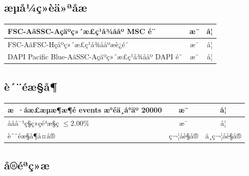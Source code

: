 \documentclass[UTF8,10pt,a4paper,fontset=fandol]{ctexart}
\newcommand{\fieldvalue}[1]{#1}
\newcommand{\handwritten}[1]{#1}
\begin{document}
\subsection*{æµå¼ç»èä»ªåæ}

\begin{tabularx}{\textwidth}{|X|c|c|}
\hline
FSC-AãSSC-Açäºç»´æ£ç¹å¾ååº MSC é¨ &
\fieldvalue{\handwritten{æ¯}} & å¦ \\
\hline
FSC-AãFSC-Hçäºç»´æ£ç¹å¾ååºæè¿é¨ &
\fieldvalue{\handwritten{æ¯}} & å¦ \\
\hline
DAPI Pacific Blue-AãSSC-Açäºç»´æ£ç¹å¾ååº DAPI é¨ &
\fieldvalue{\handwritten{æ¯}} & å¦ \\
\hline
\end{tabularx}

\subsection*{è´¨éæ§å¶}

\begin{tabularx}{\textwidth}{|X|c|c|}
\hline
æ ·åæ£æµæ¶æ¶é events æ°éä¸å°äº 20000 &
\fieldvalue{\handwritten{æ¯}} & å¦ \\
\hline
ååå¯¹ç§ç»çé³æ§ç $\leq 2.00\%$ &
\fieldvalue{\handwritten{æ¯}} & å¦ \\
\hline
è´¨éæ§å¶å¤å® &
\fieldvalue{\handwritten{ç¬¦åè§å®}} & ä¸ç¬¦åè§å® \\
\hline
\end{tabularx}

\subsection*{å®éªç»æ}
\end{document}
